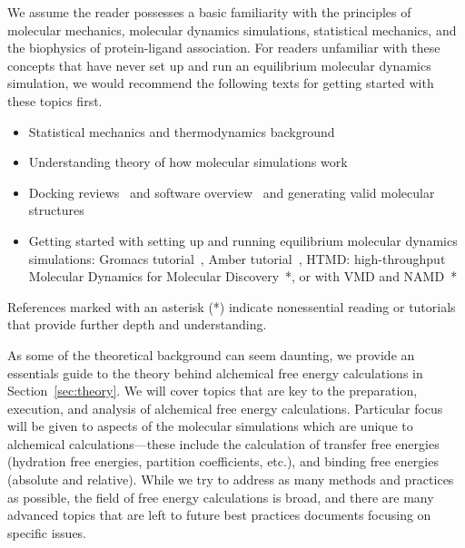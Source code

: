 \documentclass[9pt,bestpractices]{livecoms}
\begin{document}
We assume the reader possesses a basic familiarity with the principles of molecular mechanics, molecular dynamics simulations, statistical mechanics, and the biophysics of protein-ligand association.
For readers unfamiliar with these concepts that have never set up and run an equilibrium molecular dynamics simulation, we would recommend the following texts for getting started with these topics first. 
\begin{itemize}
    \item Statistical mechanics and thermodynamics background~\cite{hill1956statistical, alavi2011statistical}
    \item Understanding theory of how molecular simulations work~\cite{frenkel2002understanding}
    \item Docking reviews~\cite{yuriev2013latest, meng2011molecular} and software overview~\cite{pagadala2017software} and generating valid molecular structures ~\cite{loeffler2015fesetup}
    \item Getting started with setting up and running equilibrium molecular dynamics simulations: Gromacs tutorial~\cite{lemkul2018From}, Amber tutorial~\cite{amber}, HTMD: high-throughput Molecular Dynamics for Molecular Discovery~\cite{doerr2016htmd}*, or with VMD and NAMD~\cite{ribeiro2016easy}*
\end{itemize}
References marked with an asterisk (*) indicate nonessential reading or tutorials that provide further depth and understanding.

As some of the theoretical background can seem daunting, we provide an essentials guide to the theory behind alchemical free energy calculations in Section~\ref{sec:theory}. 
We will cover topics that are key to the  preparation, execution, and analysis of alchemical free energy calculations. 
Particular focus will be given to aspects of the molecular simulations which are unique to alchemical calculations---these include the calculation of transfer free energies (hydration free energies, partition coefficients, etc.), and binding free energies (absolute and relative).
While we try to address as many methods and practices as possible, the field of free energy calculations is broad, and there are many advanced topics that are left to future best practices documents focusing on specific issues. 
\end{document}
